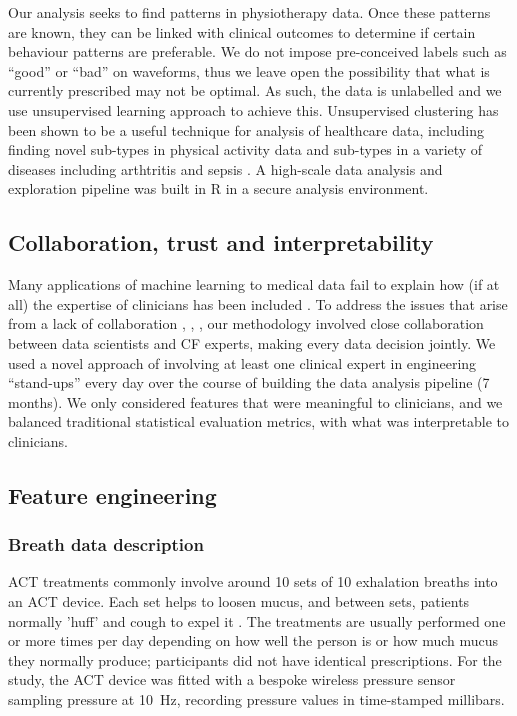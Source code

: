\documentclass{article}
\begin{document}
Our analysis seeks to find patterns in physiotherapy data. Once these patterns are known, they can be linked with clinical outcomes to determine if certain behaviour patterns are preferable. We do not impose pre-conceived labels such as “good” or “bad” on waveforms, thus we leave open the possibility that what is currently prescribed may not be optimal. As such, the data is unlabelled and we use unsupervised learning approach to achieve this. Unsupervised clustering has been shown to be a useful technique for analysis of healthcare data, including finding novel sub-types in physical activity data \cite{physical_activity_patterns_2017} and sub-types in a variety of diseases including arthtritis \cite{Eng2019} and sepsis \cite{Seymour2019}. A high-scale data analysis and exploration pipeline was built in R in a secure analysis environment.  

\subsection{Collaboration, trust and interpretability}

Many applications of machine learning to medical data fail to explain how (if at all) the expertise of clinicians has been included \cite{Alaa2018}. To address the issues that arise from a lack of collaboration \cite{Vayena2018}, \cite{Challen231}, \cite{Char2018}, \cite{Ahmad2018} our methodology involved close collaboration between data scientists and CF experts, making every data decision jointly. We used a novel approach of involving at least one clinical expert in engineering “stand-ups” every day over the course of building the data analysis pipeline (7 months). We only considered features that were meaningful to clinicians, and we balanced traditional statistical evaluation metrics, with what was interpretable to clinicians.  

\subsection{Feature engineering}

\subsubsection{Breath data description}

ACT treatments commonly involve around 10 sets of 10 exhalation breaths into an ACT device.  Each set helps to loosen mucus, and between sets, patients normally 'huff' and cough to expel it \cite{Villanuevaj4574}. The treatments are usually performed one or more times per day depending on how well the person is or how much mucus they normally produce; participants did not have identical prescriptions. For the study, the ACT device was fitted with a bespoke wireless pressure sensor sampling pressure at 10~Hz, recording pressure values in time-stamped millibars.  
\end{document}

